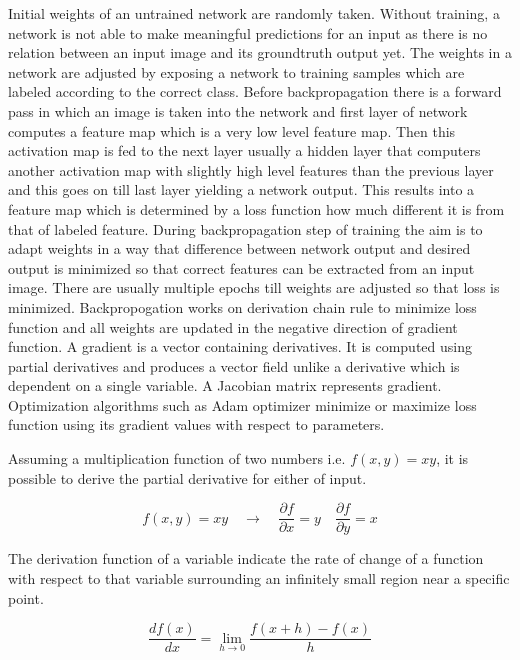\documentclass[11pt]{article}
\begin{document}
Initial weights of an untrained network are randomly taken. Without training, a network is not able to make meaningful predictions for an input as there is no relation between an input image and its groundtruth output yet. The weights in a network are adjusted by exposing a network to training samples which are labeled according to the correct class. Before backpropagation there is a forward pass in which an image is taken into the network and first layer of network computes a feature map which is a very low level feature map. Then this activation map is fed to the next layer usually a hidden layer that computers another activation map with slightly high level features than the previous layer and this goes on till last layer yielding a network output. This results into a feature map which is determined by a loss function how much different it is from that of labeled feature. During backpropagation step of training the aim is to adapt weights in a way that difference between network output and desired output is minimized so that correct features can be extracted from an input image. There are usually multiple epochs till weights are adjusted so that loss is minimized. Backpropogation works on derivation chain rule to minimize loss function and all weights are updated in the negative direction of gradient function. A gradient is a vector containing derivatives. It is computed using partial derivatives and produces a vector field unlike a derivative which is dependent on a single variable. A Jacobian matrix represents gradient. Optimization algorithms such as Adam optimizer minimize or maximize loss function using its gradient values with respect to parameters.

Assuming a multiplication function of two numbers i.e. $f(x, y)=x y$, it is possible to derive the partial derivative for either of input.

\begin{equation}
f(x, y)=x y \quad \rightarrow \quad \frac{\partial f}{\partial x}=y \quad \frac{\partial f}{\partial y}=x
\end{equation}

The derivation function of a variable indicate the rate of change of a function with respect to that variable surrounding an infinitely small region near a specific point.

\begin{equation}
\frac{d f(x)}{d x}=\lim _{h \rightarrow 0} \frac{f(x+h)-f(x)}{h}
\end{equation}
\end{document}
